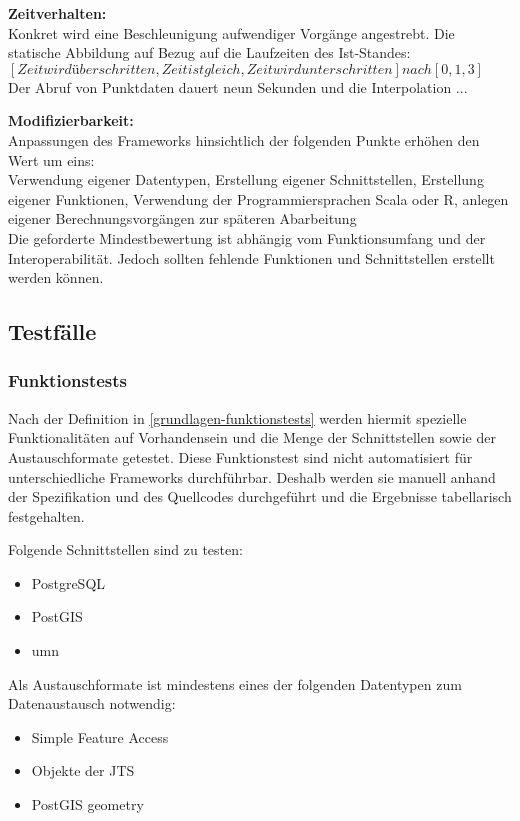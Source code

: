 \textbf{Zeitverhalten:}\\
Konkret wird eine Beschleunigung aufwendiger Vorgänge angestrebt.
Die statische Abbildung auf Bezug auf die Laufzeiten des Ist-Standes:\\
$[Zeit wird überschritten, Zeit ist gleich, Zeit wird unterschritten] nach [0,1,3]$\\
Der Abruf von Punktdaten dauert neun Sekunden und die Interpolation ...

\textbf{Modifizierbarkeit:}\\
Anpassungen des Frameworks hinsichtlich der folgenden Punkte erhöhen den Wert um eins:\\
Verwendung eigener Datentypen, Erstellung eigener Schnittstellen, Erstellung eigener Funktionen, Verwendung der Programmiersprachen Scala oder R, anlegen eigener Berechnungsvorgängen zur späteren Abarbeitung\\
Die geforderte Mindestbewertung ist abhängig vom Funktionsumfang und der Interoperabilität.
Jedoch sollten fehlende Funktionen und Schnittstellen erstellt werden können.

\subsection{Testfälle}
\subsubsection{Funktionstests}
Nach der Definition in \ref{grundlagen-funktionstests} werden hiermit spezielle Funktionalitäten auf Vorhandensein und die Menge der Schnittstellen sowie der Austauschformate getestet.
Diese Funktionstest sind nicht automatisiert für unterschiedliche Frameworks durchführbar.
Deshalb werden sie manuell anhand der Spezifikation und des Quellcodes durchgeführt und die Ergebnisse tabellarisch festgehalten.

Folgende Schnittstellen sind zu testen:
\begin{itemize}
\item PostgreSQL
\item PostGIS
\item \Gls{umn}
\end{itemize}

Als Austauschformate ist mindestens eines der folgenden Datentypen zum Datenaustausch notwendig:
\begin{itemize}
\item Simple Feature Access
\item Objekte der JTS
\item PostGIS geometry
\end{itemize}

